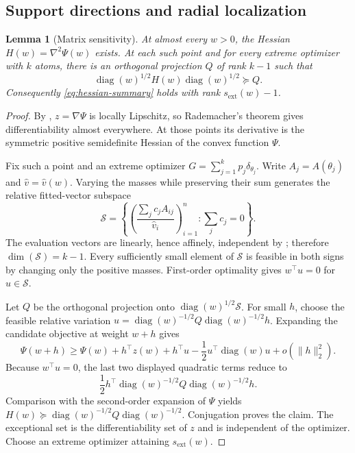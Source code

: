 \documentclass[11pt]{article}
\newtheorem{lemma}[lemma]{Lemma}
\theoremstyle{definition}
\theoremstyle{remark}
\DeclareMathOperator{\diag}{diag}
\newcommand{\norm}[1]{\lVert #1\rVert}
\newcommand{\vhat}{\widehat v}
\begin{document}
\subsection{Support directions and radial localization}

\begin{lemma}[Matrix sensitivity]
\label{lem:matrix-sensitivity}
At almost every $w>0$, the Hessian $H(w)=\nabla^2\Psi(w)$ exists.  At each
such point and for every extreme optimizer with $k$ atoms, there is an
orthogonal projection $Q$ of rank $k-1$ such that
\[
 \diag(w)^{1/2}H(w)\diag(w)^{1/2}\succeq Q.
\]
Consequently \eqref{eq:hessian-summary} holds with rank
$s_{\mathrm{ext}}(w)-1$.
\end{lemma}

\begin{proof}
By , $z=\nabla\Psi$ is locally Lipschitz, so Rademacher's
theorem gives differentiability almost everywhere.  At those points its
derivative is the symmetric positive semidefinite Hessian of the convex
function $\Psi$.

Fix such a point and an extreme optimizer
$G=\sum_{j=1}^kp_j\delta_{\theta_j}$.  Write
$A_j=A(\theta_j)$ and $\widehat v=\vhat(w)$.  Varying the masses while
preserving their sum generates the relative fitted-vector subspace
\[
 \mathcal S=\left\{
 \left(\frac{\sum_jc_jA_{ij}}{\widehat v_i}\right)_{i=1}^n:
 \sum_jc_j=0\right\}.
\]
The evaluation vectors are linearly, hence affinely, independent by
; therefore $\dim(\mathcal S)=k-1$.  Every sufficiently
small element of $\mathcal S$ is feasible in both signs by changing only the
positive masses.  First-order optimality gives $w^\top u=0$ for
$u\in\mathcal S$.

Let $Q$ be the orthogonal projection onto
$\diag(w)^{1/2}\mathcal S$.  For small $h$, choose the feasible relative
variation
$u=\diag(w)^{-1/2}Q\diag(w)^{-1/2}h$.  Expanding the candidate objective at
weight $w+h$ gives
\[
 \Psi(w+h)\ge\Psi(w)+h^\top z(w)
 +h^\top u-\frac12u^\top\diag(w)u+o(\norm{h}_2^2).
\]
Because $w^\top u=0$, the last two displayed quadratic terms reduce to
\[
 \frac12h^\top\diag(w)^{-1/2}Q\diag(w)^{-1/2}h.
\]
Comparison with the second-order expansion of $\Psi$ yields
$H(w)\succeq\diag(w)^{-1/2}Q\diag(w)^{-1/2}$.  Conjugation proves the claim.
The exceptional set is the differentiability set of $z$ and is independent
of the optimizer.  Choose an extreme optimizer attaining
$s_{\mathrm{ext}}(w)$.
\end{proof}
\end{document}
